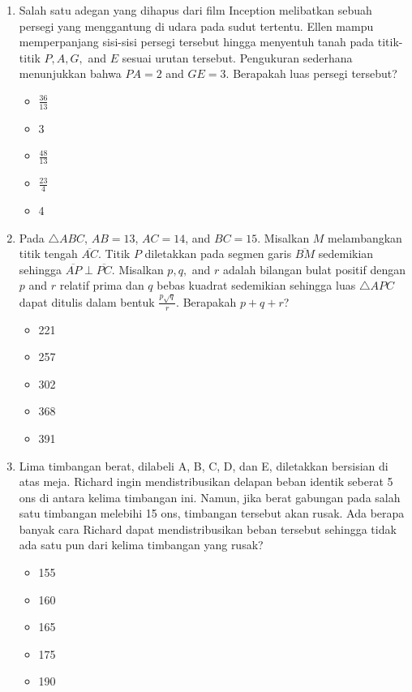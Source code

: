 \documentclass[10pt]{article}
\begin{document}
\begin{enumerate}
    \item Salah satu adegan yang dihapus dari film Inception melibatkan sebuah persegi yang menggantung di udara pada sudut tertentu. Ellen mampu memperpanjang sisi-sisi persegi tersebut hingga menyentuh tanah pada titik-titik $P, A, G,$ and $E$ sesuai urutan tersebut. Pengukuran sederhana menunjukkan bahwa $PA=2$ and $GE=3$. Berapakah luas persegi tersebut?
    \begin{itemize}
        \item[(A)] $\frac{36}{13}$
        \item[(B)] 3
        \item[(C)] $\frac{48}{13}$
        \item[(D)] $\frac{23}{4}$
        \item[(E)] 4
    \end{itemize}

    \item Pada $\triangle ABC$, $AB=13$, $AC=14$, and $BC=15$. Misalkan $M$ melambangkan titik tengah $\overline{AC}$. Titik $P$ diletakkan pada segmen garis $\overline{BM}$ sedemikian sehingga $\overline{AP}\perp\overline{PC}$. Misalkan $p, q,$ and $r$ adalah bilangan bulat positif dengan $p$ and $r$ relatif prima dan $q$ bebas kuadrat sedemikian sehingga luas $\triangle APC$ dapat ditulis dalam bentuk $\frac{p\sqrt{q}}{r}$. Berapakah $p+q+r$?
    \begin{itemize}
        \item[(A)] 221
        \item[(B)] 257
        \item[(C)] 302
        \item[(D)] 368
        \item[(E)] 391
    \end{itemize}

    \item Lima timbangan berat, dilabeli A, B, C, D, dan E, diletakkan bersisian di atas meja. Richard ingin mendistribusikan delapan beban identik seberat 5 ons di antara kelima timbangan ini. Namun, jika berat gabungan pada salah satu timbangan melebihi 15 ons, timbangan tersebut akan rusak. Ada berapa banyak cara Richard dapat mendistribusikan beban tersebut sehingga tidak ada satu pun dari kelima timbangan yang rusak?
    \begin{itemize}
        \item[(A)] 155
        \item[(B)] 160
        \item[(C)] 165
        \item[(D)] 175
        \item[(E)] 190
    \end{itemize}


\end{enumerate}
\end{document}
